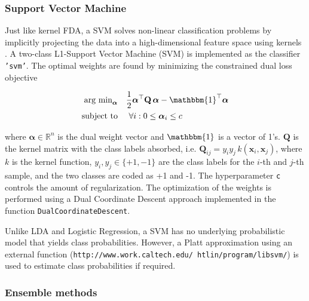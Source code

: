 \documentclass[utf8]{frontiersSCNS} %
\newcommand{\al}{\boldsymbol{\alpha}}
\newcommand{\x}{\mathbf{x}}
\newcommand{\Q}{\mathbf{Q}}
\newcommand{\R}{\mathbb{R}}
\newcommand{\ttt}[1]{\texttt{#1}}
\begin{document}
\subsubsection{Support Vector Machine}

Just like kernel FDA, a SVM solves non-linear classification problems by implicitly projecting the data into a high-dimensional feature space using kernels \citep{Bishop2007}.
A two-class L1-Support Vector Machine (SVM) is implemented as the classifier \ttt{'svm'}.
The optimal weights are found by minimizing the constrained dual loss objective

\begin{align}
\begin{split}
\label{eq:svm_dual_loss_function}
\text{arg min}_{\al}\quad
& \frac{1}{2} \al^\top\Q\,\al - \mathbbm{1}^\top\al\\
\text{subject to}\quad  &\ \forall i: 0 \le \al_i \le c
\end{split}
\end{align}

where $\al\in\R^n$ is the dual weight vector and  $\mathbbm{1}$ is a vector of 1's. $\Q$ is the kernel matrix with the class labels absorbed, i.e. $\Q_{ij} = y_i y_j\, k(\x_i,\x_j)$, where $k$ is the kernel function, $y_i, y_j \in\{+1, -1\}$ are the class labels for the $i$-th and $j$-th sample, and the two classes are coded as +1 and -1. The hyperparameter  \ttt{c} controls the amount of regularization. The optimization of the weights is performed using a Dual Coordinate Descent approach  \citep{Hsieh2008ASVM} implemented in the function \ttt{DualCoordinateDescent}. 


Unlike LDA and Logistic Regression, a SVM has no underlying probabilistic model that yields class probabilities. However, a Platt approximation using an external function (\ttt{http://www.work.caltech.edu/~htlin/program/libsvm/}) is used to estimate class probabilities if required.


\subsubsection{Ensemble methods}
\end{document}
